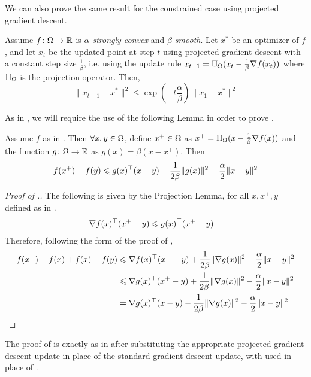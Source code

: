 We can also prove the same result for the constrained case using projected
gradient descent.

\begin{theorem} 
Assume $f\colon\Omega\to\mathbb{R}$ is \emph{$\alpha$-strongly convex} and
\emph{$\beta$-smooth}. Let $x^{*}$ be an optimizer of $f$, and let $x_{t}$ be
the updated point at step $t$ using projected gradient descent with a constant
step size $\frac{1}{\beta}$, i.e. using the update rule $x_{t+1} =
\Pi_{\Omega}(x_{t} - \frac{1}{\beta}\nabla f(x_{t}))$ where $\Pi_{\Omega}$ is
the projection operator. Then, 
\[
\|x_{t+1} - x^*\|^2 \leq \exp{(-t \frac{\alpha}{\beta})}\|x_1 - x^*\|^2
\]
\end{theorem}
As in , we will require the
use of the following Lemma in order to prove
. 

\begin{lemma}
    Assume $f$ as in . Then $\forall x,y \in \Omega$, define $x^+\in\Omega$ as $x^+ = \Pi_{\Omega}(x - \frac{1}{\beta}\nabla f(x))$ and the function $g\colon\Omega\to\mathbb{R}$ as $g(x) = \beta(x-x^+)$. Then
    \[
        f(x^+) - f(y) \leqslant g(x)^\top (x-y) - \frac{1}{2\beta}\|g(x)\|^2 - \frac{\alpha}{2}\|x-y\|^2
    \]
\end{lemma}

\begin{proof}[Proof of .]
    The following is given by the Projection Lemma, for all $x,x^+,y$ defined as in .
    \begin{align*}
        \nabla f(x)^\top (x^+ - y) &\leqslant g(x)^\top(x^+ - y)
    \end{align*}
    Therefore, following the form of the proof of ,
    \begin{align*}
        f(x^+) - f(x) + f(x) - f(y) &\leqslant \nabla f(x)^\top(x^+-y) + \frac{1}{2\beta}\|\nabla g(x)\|^2 - \frac{\alpha}{2}\|x-y\|^2\\
        &\leqslant \nabla g(x)^\top(x^+-y) + \frac{1}{2\beta}\|\nabla g(x)\|^2 - \frac{\alpha}{2}\|x-y\|^2\\
        &= \nabla g(x)^\top(x-y) - \frac{1}{2\beta}\|\nabla g(x)\|^2 -
\frac{\alpha}{2}\|x-y\|^2\qedhere
    \end{align*}
\end{proof}

The proof of  is
exactly as in  after
substituting the appropriate projected gradient descent update in place of the
standard gradient descent update, with
 used in place of
. 
